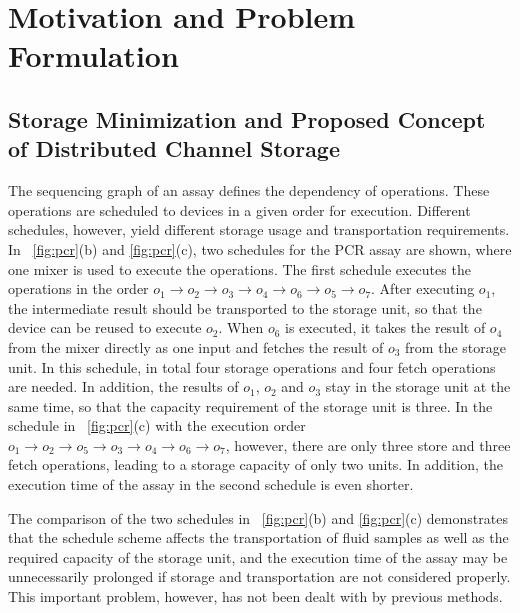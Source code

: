 
\section{Motivation and Problem Formulation}\label{sec:motivation}

\subsection{Storage Minimization and Proposed Concept of Distributed Channel Storage}
The sequencing graph of an assay defines the dependency of operations. These
operations are scheduled to devices in a given order for execution. Different
schedules, however, yield different storage usage and transportation
requirements.
%
In \figname~\ref{fig:pcr}(b) and \ref{fig:pcr}(c), two schedules
for the PCR assay are shown, where one mixer is used to execute the
operations. The first schedule executes the operations in the order
$o_1\to o_2\to o_3 \to o_4 \to o_6 \to o_5\to o_7$. After executing $o_1$, the
intermediate result should be transported to the storage unit, so that the device
can be reused to execute $o_2$. When $o_6$ is executed, it takes the result of
$o_4$ from the mixer directly as one input and fetches the result of $o_3$
from the storage unit. In this schedule, in total four storage operations
and four fetch operations are needed. In addition, the results of $o_1$,
$o_2$ and $o_3$ stay in the storage unit at the same time, so that the
capacity requirement of the storage unit is three.
In the schedule in \figname~\ref{fig:pcr}(c) with the execution order
$o_1\to o_2\to o_5 \to o_3 \to o_4 \to o_6\to o_7$,
however, there are only three store and three fetch operations,
leading to a storage capacity of only two units.
In addition, the execution
time of the assay in the second schedule is even shorter.

The comparison of the two schedules in \figname~\ref{fig:pcr}(b) and
\ref{fig:pcr}(c) demonstrates that the schedule scheme affects the
transportation of fluid samples as well as the required capacity of the storage unit,
and the execution time of the assay may be unnecessarily prolonged if storage
and transportation are not considered properly.
This important problem, however, has not been dealt with by previous
methods.

